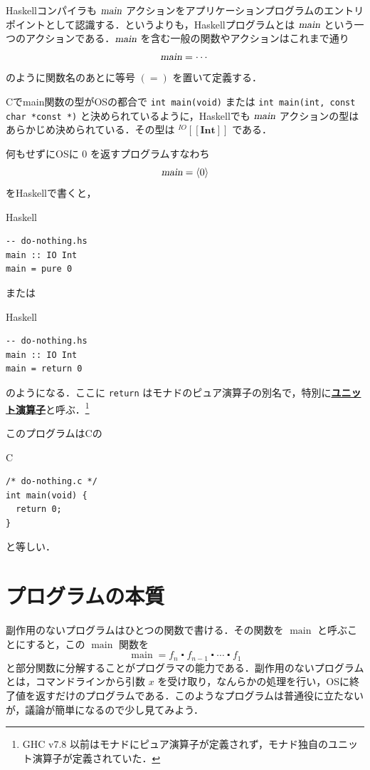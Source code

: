 \documentclass[a4paper,twocolumn]{jsbook}
\def\[{\left[\!\left[}
\def\]{\right]\!\right]}
\newcommand{\programminglanguage}[1]{\textsf{#1}}
\newcommand{\clang}{\programminglanguage{C}}
\newcommand{\haskell}{\programminglanguage{Haskell}}
\newcommand{\keyword}[1]{{\underline{\textbf{#1}}}}
\newcommand{\code}[1]{\texttt{#1}}
\newenvironment{ccode}{\begin{itembox}[r]{\clang}}{\end{itembox}}
\newenvironment{haskellcode}{\begin{itembox}[r]{\haskell}}{\end{itembox}}
\newcommand{\mSpecialFunc}[1]{\mathrm{#1}}
\DeclareMathOperator{\mMainFunc}{\mSpecialFunc{main}}
\newcommand{\mAction}[1]{\textsl{#1}}
\DeclareMathOperator{\mMain}{\mAction{main}}
\DeclareMathOperator{\mComp}{\centerdot}
\newcommand{\mType}[1]{\mathbf{#1}}
\newcommand{\mIntType}{\mType{Int}}
\newcommand{\mIOIntType}{\mIOType{\mIntType}}
\newcommand{\mTypeConstructor}[1]{\textit{#1}}
\newcommand{\mGenericTypeAssemble}[2]{{}^{\mTypeConstructor{#1}}\[\mType{#2}\]}
\newcommand{\mIOType}[1]{\mGenericTypeAssemble{IO}{#1}}
\newcommand{\mPureWith}[1]{\langle#1\rangle}
\begin{document}
\haskell コンパイラも $\mMain$ アクションをアプリケーションプログラムのエントリポイントとして認識する．というよりも，\haskell プログラムとは $\mMain$ という一つのアクションである．$\mMain$ を含む一般の関数やアクションはこれまで通り
\begin{equation}
\mMain=\dotsb
\end{equation}
のように関数名のあとに等号 $(=)$ を置いて定義する．

\clang でmain関数の型がOSの都合で \code{int main(void)} または \code{int main(int, const char *const *)} と決められているように，\haskell でも $\mMain$ アクションの型はあらかじめ決められている．その型は $\mIOIntType$ である． 

何もせずにOSに $0$ を返すプログラムすなわち
\begin{equation}
\mMain=\mPureWith{0}
\end{equation}
を\haskell で書くと，
\begin{haskellcode}
\begin{verbatim}
-- do-nothing.hs
main :: IO Int
main = pure 0
\end{verbatim}
\end{haskellcode}
または
\begin{haskellcode}
\begin{verbatim}
-- do-nothing.hs
main :: IO Int
main = return 0
\end{verbatim}
\end{haskellcode}
のようになる．ここに \code{return} はモナドのピュア演算子の別名で，特別に\keyword{ユニット演算子}と呼ぶ．\footnote{GHC v7.8 以前はモナドにピュア演算子が定義されず，モナド独自のユニット演算子が定義されていた．}

このプログラムは\clang の
\begin{ccode}
\begin{verbatim}
/* do-nothing.c */
int main(void) {
  return 0;
}
\end{verbatim}
\end{ccode}
と等しい．

\section{プログラムの本質}

副作用のないプログラムはひとつの関数で書ける．その関数を $\mMainFunc$ と呼ぶことにすると，この $\mMainFunc$ 関数を
\begin{equation}
\mMainFunc=f_n\mComp f_{n-1}\mComp\dotsb\mComp f_1
\end{equation}
と部分関数に分解することがプログラマの能力である．副作用のないプログラムとは，コマンドラインから引数 $x$ を受け取り，なんらかの処理を行い，OSに終了値を返すだけのプログラムである．このようなプログラムは普通役に立たないが，議論が簡単になるので少し見てみよう．
\end{document}
